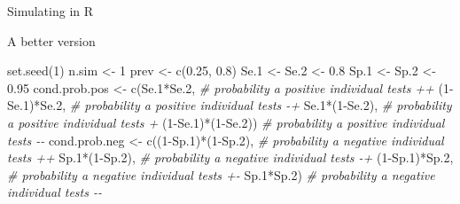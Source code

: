 \documentclass[
  ignorenonframetext,
]{beamer}
\newenvironment{Shaded}{\begin{snugshade}}{\end{snugshade}}
\newcommand{\CommentTok}[1]{\textcolor[rgb]{0.56,0.35,0.01}{\textit{#1}}}
\newcommand{\DecValTok}[1]{\textcolor[rgb]{0.00,0.00,0.81}{#1}}
\newcommand{\FloatTok}[1]{\textcolor[rgb]{0.00,0.00,0.81}{#1}}
\newcommand{\FunctionTok}[1]{\textcolor[rgb]{0.00,0.00,0.00}{#1}}
\newcommand{\NormalTok}[1]{#1}
\newcommand{\OtherTok}[1]{\textcolor[rgb]{0.56,0.35,0.01}{#1}}
\newcommand{\SpecialCharTok}[1]{\textcolor[rgb]{0.00,0.00,0.00}{#1}}
\begin{document}
\begin{frame}[fragile]{Simulating in R}
\begin{block}{A better version}
\protect\hypertarget{a-better-version}{}
\begin{Shaded}
\begin{Highlighting}[]
  \FunctionTok{set.seed}\NormalTok{(}\DecValTok{1}\NormalTok{)}
\NormalTok{  n.sim }\OtherTok{\textless{}{-}} \DecValTok{1}
\NormalTok{  prev }\OtherTok{\textless{}{-}} \FunctionTok{c}\NormalTok{(}\FloatTok{0.25}\NormalTok{, }\FloatTok{0.8}\NormalTok{)}
\NormalTok{  Se}\FloatTok{.1} \OtherTok{\textless{}{-}}\NormalTok{ Se}\FloatTok{.2} \OtherTok{\textless{}{-}} \FloatTok{0.8}
\NormalTok{  Sp}\FloatTok{.1} \OtherTok{\textless{}{-}}\NormalTok{ Sp}\FloatTok{.2} \OtherTok{\textless{}{-}} \FloatTok{0.95}
\NormalTok{  cond.prob.pos }\OtherTok{\textless{}{-}} \FunctionTok{c}\NormalTok{(Se}\FloatTok{.1}\SpecialCharTok{*}\NormalTok{Se}\FloatTok{.2}\NormalTok{, }\CommentTok{\# probability a positive individual tests ++ }
\NormalTok{                     (}\DecValTok{1}\SpecialCharTok{{-}}\NormalTok{Se}\FloatTok{.1}\NormalTok{)}\SpecialCharTok{*}\NormalTok{Se}\FloatTok{.2}\NormalTok{, }\CommentTok{\# probability a positive individual tests {-}+ }
\NormalTok{                     Se}\FloatTok{.1}\SpecialCharTok{*}\NormalTok{(}\DecValTok{1}\SpecialCharTok{{-}}\NormalTok{Se}\FloatTok{.2}\NormalTok{), }\CommentTok{\# probability a positive individual tests + }
\NormalTok{                     (}\DecValTok{1}\SpecialCharTok{{-}}\NormalTok{Se}\FloatTok{.1}\NormalTok{)}\SpecialCharTok{*}\NormalTok{(}\DecValTok{1}\SpecialCharTok{{-}}\NormalTok{Se}\FloatTok{.2}\NormalTok{)) }\CommentTok{\# probability a positive individual tests {-}{-}}
\NormalTok{  cond.prob.neg }\OtherTok{\textless{}{-}} \FunctionTok{c}\NormalTok{((}\DecValTok{1}\SpecialCharTok{{-}}\NormalTok{Sp}\FloatTok{.1}\NormalTok{)}\SpecialCharTok{*}\NormalTok{(}\DecValTok{1}\SpecialCharTok{{-}}\NormalTok{Sp}\FloatTok{.2}\NormalTok{), }\CommentTok{\# probability a negative individual tests ++}
\NormalTok{                     Sp}\FloatTok{.1}\SpecialCharTok{*}\NormalTok{(}\DecValTok{1}\SpecialCharTok{{-}}\NormalTok{Sp}\FloatTok{.2}\NormalTok{), }\CommentTok{\# probability a negative individual tests {-}+}
\NormalTok{                     (}\DecValTok{1}\SpecialCharTok{{-}}\NormalTok{Sp}\FloatTok{.1}\NormalTok{)}\SpecialCharTok{*}\NormalTok{Sp}\FloatTok{.2}\NormalTok{, }\CommentTok{\# probability a negative individual tests +{-}}
\NormalTok{                     Sp}\FloatTok{.1}\SpecialCharTok{*}\NormalTok{Sp}\FloatTok{.2}\NormalTok{) }\CommentTok{\# probability a negative individual tests {-}{-}}

\end{Highlighting}
\end{Shaded}
\end{block}
\end{frame}
\end{document}
